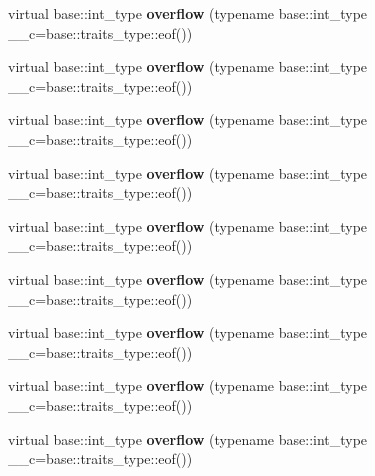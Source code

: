 \begin{DoxyCompactItemize}
virtual base\+::int\+\_\+type {\bfseries overflow} (typename base\+::int\+\_\+type \+\_\+\+\_\+c=base\+::traits\+\_\+type\+::eof())
\item 
\mbox{\label{structtestbuf_a1d33d01e5a3f18a1fa4407c67eb87f52}} 
virtual base\+::int\+\_\+type {\bfseries overflow} (typename base\+::int\+\_\+type \+\_\+\+\_\+c=base\+::traits\+\_\+type\+::eof())
\item 
\mbox{\label{structtestbuf_a1d33d01e5a3f18a1fa4407c67eb87f52}} 
virtual base\+::int\+\_\+type {\bfseries overflow} (typename base\+::int\+\_\+type \+\_\+\+\_\+c=base\+::traits\+\_\+type\+::eof())
\item 
\mbox{\label{structtestbuf_a1d33d01e5a3f18a1fa4407c67eb87f52}} 
virtual base\+::int\+\_\+type {\bfseries overflow} (typename base\+::int\+\_\+type \+\_\+\+\_\+c=base\+::traits\+\_\+type\+::eof())
\item 
\mbox{\label{structtestbuf_a1d33d01e5a3f18a1fa4407c67eb87f52}} 
virtual base\+::int\+\_\+type {\bfseries overflow} (typename base\+::int\+\_\+type \+\_\+\+\_\+c=base\+::traits\+\_\+type\+::eof())
\item 
\mbox{\label{structtestbuf_a1d33d01e5a3f18a1fa4407c67eb87f52}} 
virtual base\+::int\+\_\+type {\bfseries overflow} (typename base\+::int\+\_\+type \+\_\+\+\_\+c=base\+::traits\+\_\+type\+::eof())
\item 
\mbox{\label{structtestbuf_a1d33d01e5a3f18a1fa4407c67eb87f52}} 
virtual base\+::int\+\_\+type {\bfseries overflow} (typename base\+::int\+\_\+type \+\_\+\+\_\+c=base\+::traits\+\_\+type\+::eof())
\item 
\mbox{\label{structtestbuf_a1d33d01e5a3f18a1fa4407c67eb87f52}} 
virtual base\+::int\+\_\+type {\bfseries overflow} (typename base\+::int\+\_\+type \+\_\+\+\_\+c=base\+::traits\+\_\+type\+::eof())
\item 
\mbox{\label{structtestbuf_a1d33d01e5a3f18a1fa4407c67eb87f52}} 
virtual base\+::int\+\_\+type {\bfseries overflow} (typename base\+::int\+\_\+type \+\_\+\+\_\+c=base\+::traits\+\_\+type\+::eof())
\item 

\end{DoxyCompactItemize}
